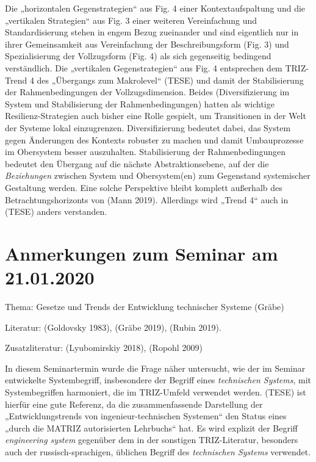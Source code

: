 \documentclass[11pt,a4paper]{article}
\begin{document}
Die „horizontalen Gegenstrategien“ aus Fig. 4 einer Kontextaufspaltung und die
„vertikalen Strategien“ aus Fig. 3 einer weiteren Vereinfachung und
Standardisierung stehen in engem Bezug zueinander und sind eigentlich nur in
ihrer Gemeinsamkeit aus Vereinfachung der Beschreibungsform (Fig. 3) und
Spezialisierung der Vollzugsform (Fig. 4) als sich gegenseitig bedingend
verständlich. Die „vertikalen Gegenstrategien“ aus Fig. 4 entsprechen dem
TRIZ-Trend 4 des „Übergangs zum Makrolevel“ (TESE) und damit der
Stabilisierung der Rahmenbedingungen der Vollzugsdimension. Beides
(Diversifizierung im System und Stabilisierung der Rahmenbedingungen) hatten
als wichtige Resilienz-Strategien auch bisher eine Rolle gespielt, um
Transitionen in der Welt der Systeme lokal einzugrenzen. Diversifizierung
bedeutet dabei, das System gegen Änderungen des Kontexts robuster zu machen
und damit Umbauprozesse im Obersystem besser auszuhalten. Stabilisierung der
Rahmenbedingungen bedeutet den Übergang auf die nächste Abstraktionsebene, auf
der die \emph{Beziehungen} zwischen System und Obersystem(en) zum Gegenstand
systemischer Gestaltung werden. Eine solche Perspektive bleibt komplett
außerhalb des Betrachtungshorizonts von (Mann 2019). Allerdings wird „Trend 4“
auch in (TESE) anders verstanden.

\section{ Anmerkungen zum Seminar am 21.01.2020}

Thema: Gesetze und Trends der Entwicklung technischer Systeme (Gräbe) 

Literatur: (Goldovsky 1983), (Gräbe 2019), (Rubin 2019).

Zusatzliteratur: (Lyubomirskiy 2018), (Ropohl 2009)

In diesem Seminartermin wurde die Frage näher untersucht, wie der im Seminar
entwickelte Systembegriff, insbesondere der Begriff eines \emph{technischen
  Systems}, mit Systembegriffen harmoniert, die im TRIZ-Umfeld verwendet
werden. (TESE) ist hierfür eine gute Referenz, da die zusammenfassende
Darstellung der „Entwicklungstrends von ingenieur-technischen Systemen“ den
Status eines „durch die MATRIZ autorisierten Lehrbuchs“ hat. Es wird explizit
der Begriff \emph{engineering system} gegenüber dem in der sonstigen
TRIZ-Literatur, besonders auch der russisch-sprachigen, üblichen Begriff des
\emph{technischen Systems} verwendet.
\end{document}
